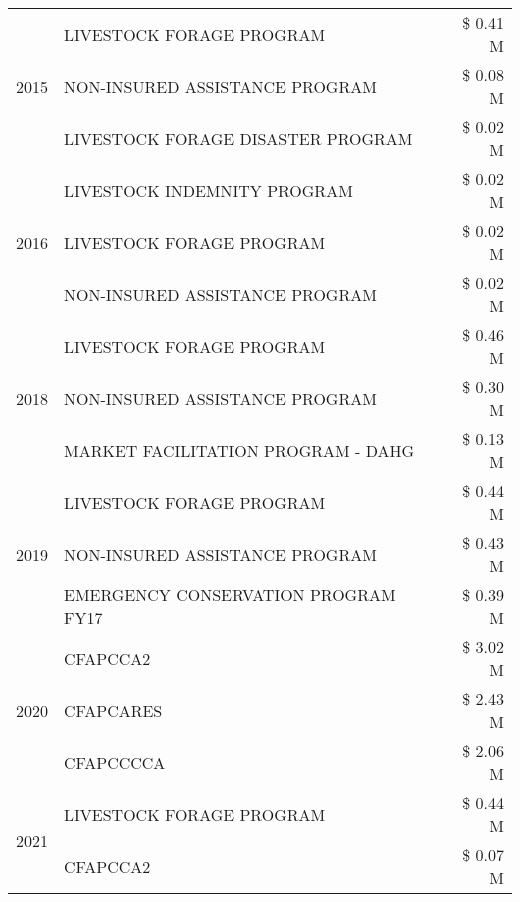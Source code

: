 \begin{tabular}{llr}
\cline{1-3}
\multirow[t]{3}{*}{2015} & LIVESTOCK FORAGE PROGRAM & \$ 0.41 M \\
 & NON-INSURED ASSISTANCE PROGRAM & \$ 0.08 M \\
 & LIVESTOCK FORAGE DISASTER PROGRAM & \$ 0.02 M \\
\cline{1-3}
\multirow[t]{3}{*}{2016} & LIVESTOCK INDEMNITY PROGRAM & \$ 0.02 M \\
 & LIVESTOCK FORAGE PROGRAM & \$ 0.02 M \\
 & NON-INSURED ASSISTANCE PROGRAM & \$ 0.02 M \\
\cline{1-3}
\multirow[t]{3}{*}{2018} & LIVESTOCK FORAGE PROGRAM & \$ 0.46 M \\
 & NON-INSURED ASSISTANCE PROGRAM & \$ 0.30 M \\
 & MARKET FACILITATION PROGRAM - DAHG & \$ 0.13 M \\
\cline{1-3}
\multirow[t]{3}{*}{2019} & LIVESTOCK FORAGE PROGRAM & \$ 0.44 M \\
 & NON-INSURED ASSISTANCE PROGRAM & \$ 0.43 M \\
 & EMERGENCY CONSERVATION PROGRAM FY17 & \$ 0.39 M \\
\cline{1-3}
\multirow[t]{3}{*}{2020} & CFAPCCA2 & \$ 3.02 M \\
 & CFAPCARES & \$ 2.43 M \\
 & CFAPCCCCA & \$ 2.06 M \\
\cline{1-3}
\multirow[t]{2}{*}{2021} & LIVESTOCK FORAGE PROGRAM & \$ 0.44 M \\
 & CFAPCCA2 & \$ 0.07 M \\
\cline{1-3}
\bottomrule
\end{tabular}
